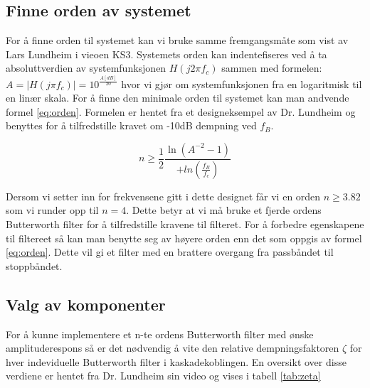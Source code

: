 \subsection{Finne orden av systemet}

For å finne orden til systemet kan vi bruke samme fremgangsmåte som vist av Lars Lundheim i vieoen KS3. Systemets orden kan indentefiseres ved å ta absoluttverdien av systemfunksjonen $H(j2\pi f_c)$ sammen med formelen: $A = |H(j\pi f_c)| = 10^{\frac{A[dB]}{20}}$ hvor vi gjør om systemfunksjonen fra en logaritmisk til en linær skala. For å finne den minimale orden til systemet kan man andvende formel \ref{eq:orden}. Formelen er hentet fra et designeksempel av Dr. Lundheim \cite{KS3} og benyttes for å tilfredstille kravet om -10dB dempning ved $f_B$.

\begin{equation}
\label{eq:orden}
n \geq \frac{1}{2}\frac{\ln{(A^{-2}-1)}}{+ln{(\frac{f_B}{f_c})}}
\end{equation}

Dersom vi setter inn for frekvensene gitt i dette designet får vi en orden $n \geq 3.82$ som vi runder opp til $n = 4$. Dette betyr at vi må bruke et fjerde ordens Butterworth filter for å tilfredstille kravene til filteret. For å forbedre egenskapene til filtereet så kan man benytte seg av høyere orden enn det som oppgis av formel \ref{eq:orden}. Dette vil gi et filter med en brattere overgang fra passbåndet til stoppbåndet.

\subsection{Valg av komponenter}
For å kunne implementere et n-te ordens Butterworth filter med ønske amplituderespons så er det nødvendig å vite den relative dempningsfaktoren $\zeta$ for hver indeviduelle Butterworth filter i kaskadekoblingen. En oversikt over disse verdiene er hentet fra Dr. Lundheim sin video og vises i tabell \ref{tab:zeta}

